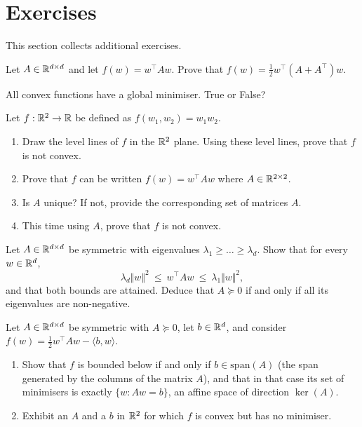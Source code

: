 \section{Exercises}
\label{sec:exercises}

This section collects additional exercises.


\begin{exercise}[$\star$]
Let $A \in \mathbb{R}^{d \times d}$ and let $f(w) = w^\top A w$. Prove that $f(w) = \frac{1}{2} w^\top (A + A^\top) w$.
\end{exercise}

\begin{exercise}[$\star$]
All convex functions have a global minimiser. True or False?
\end{exercise}

\begin{exercise}[$\star$]
Let $f : \mathbb{R}^2 \to \mathbb{R}$ be defined as $f(w_1, w_2) = w_1 w_2$. 
\begin{enumerate}
    \item Draw the level lines of $f$ in the $\mathbb{R}^2$ plane. Using these level lines, prove that $f$ is not convex.
    \item Prove that $f$ can be written $f(w) = w^\top A w$ where $A \in \mathbb{R}^{2\times 2}$. 
    \item Is $A$ unique? If not, provide the corresponding set of matrices $A$.
    \item This time using $A$, prove that $f$ is not convex.
\end{enumerate}
\end{exercise}


\begin{exercise}[$\star$]
Let $A \in \mathbb{R}^{d \times d}$ be symmetric with eigenvalues $\lambda_1 \geq \dots \geq
\lambda_d$. Show that for every $w \in \mathbb{R}^d$,
\[
\lambda_d \Vert w \Vert^2 \ \leq \ w^\top A w \ \leq \ \lambda_1 \Vert w \Vert^2 ,
\]
and that both bounds are attained. Deduce that $A \succeq 0$ if and only if all its
eigenvalues are non-negative.
\end{exercise}

\begin{exercise}[$\star\star$]
Let $A \in \mathbb{R}^{d \times d}$ be symmetric with $A \succeq 0$, let $b \in \mathbb{R}^d$, and
consider $f(w) = \frac{1}{2} w^\top A w - \langle b, w \rangle$.
\begin{enumerate}
    \item Show that $f$ is bounded below if and only if $b \in \mathrm{span}(A)$ (the span generated by the columns of the matrix $A$), and that in
    that case its set of minimisers is exactly $\{ w : Aw = b \}$, an affine space of
    direction $\ker(A)$.
    \item Exhibit an $A$ and a $b$ in $\mathbb{R}^2$ for which $f$ is convex but has no
    minimiser. 
\end{enumerate}
\end{exercise}

